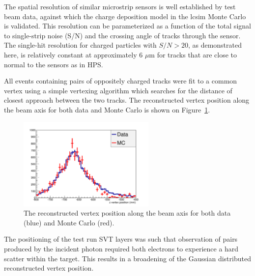 The spatial resolution of similar microstrip sensors is well established by test beam data, against which the charge deposition model in the lcsim Monte Carlo is validated.  This resolution can be parameterized as a function of the total signal to single-strip noise (S/N) and the crossing angle of tracks through the sensor.  The single-hit resolution for charged particles with $S/N > 20$, as demonstrated here, is relatively constant at approximately 6 $\mu$m for tracks that are close to normal to the sensors as in HPS.


All events containing pairs of oppositely charged tracks were fit to a
common vertex using a simple vertexing algorithm which searches for the distance
of closest approach between the two tracks.  The reconstructed vertex position
along the beam axis for both data and Monte Carlo is shown on 
Figure~\ref{fig:vz_position}.
\begin{figure}[h]
    \begin{center}
    	\includegraphics[width=0.60\textwidth]{test2012/svtperformance/trk_performance/zvertex.pdf}
        \caption{  
                    The reconstructed vertex position along the beam axis for
                    both data (blue) and Monte Carlo (red).
                } 
	\label{fig:vz_position}
    \end{center}
\end{figure}
The positioning of the test run SVT layers was such that observation of pairs produced by
the incident photon required both electrons to experience a hard scatter
within the target.  This results in a broadening of the Gaussian 
distributed reconstructed vertex position. 
